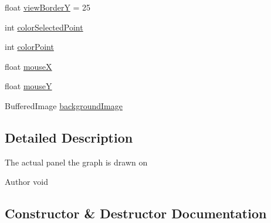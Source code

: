 \begin{DoxyCompactItemize}
\item 
float \mbox{\hyperlink{classorg_1_1newdawn_1_1slick_1_1tools_1_1peditor_1_1_graph_editor_window_1_1_graph_panel_a0074f829773ff8b15c654710170a0962}{view\+BorderY}} = 25
\item 
int \mbox{\hyperlink{classorg_1_1newdawn_1_1slick_1_1tools_1_1peditor_1_1_graph_editor_window_1_1_graph_panel_a2504cd81380657b150f186f9560cf33c}{color\+Selected\+Point}}
\item 
int \mbox{\hyperlink{classorg_1_1newdawn_1_1slick_1_1tools_1_1peditor_1_1_graph_editor_window_1_1_graph_panel_a82bb6d648f2714b3b7e4fd90b57fdb4e}{color\+Point}}
\item 
float \mbox{\hyperlink{classorg_1_1newdawn_1_1slick_1_1tools_1_1peditor_1_1_graph_editor_window_1_1_graph_panel_ab69722127025b04438af3ce7858928c4}{mouseX}}
\item 
float \mbox{\hyperlink{classorg_1_1newdawn_1_1slick_1_1tools_1_1peditor_1_1_graph_editor_window_1_1_graph_panel_a645c35775cd9ec2cbea8d05a0af9c793}{mouseY}}
\item 
Buffered\+Image \mbox{\hyperlink{classorg_1_1newdawn_1_1slick_1_1tools_1_1peditor_1_1_graph_editor_window_1_1_graph_panel_a281be1220a55ccb509f7c25f34bf6740}{background\+Image}}
\end{DoxyCompactItemize}


\subsection{Detailed Description}
The actual panel the graph is drawn on

\begin{DoxyAuthor}{Author}
void 
\end{DoxyAuthor}


\subsection{Constructor \& Destructor Documentation}
\mbox{\label{classorg_1_1newdawn_1_1slick_1_1tools_1_1peditor_1_1_graph_editor_window_1_1_graph_panel_a57f061e9016d6cd5206ba3467f01445c}} 
